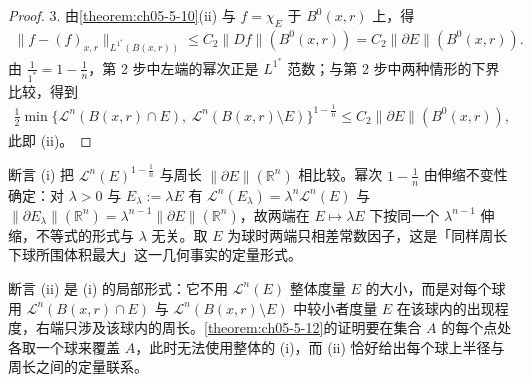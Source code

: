 ﻿\documentclass[../../main.tex]{subfiles}%
\begin{document}
\begin{proof}
3. 由\cref{theorem:ch05-5-10}(ii) 与 $f=\chi_E$ 于 $B^0(x,r)$ 上，得%
\begin{align*}
\lVert f-(f)_{x,r}\rVert_{L^{1^*}(B(x,r))}\leqslant C_2\lVert Df\rVert(B^0(x,r))=C_2\lVert\partial E\rVert(B^0(x,r)).
\end{align*}
由 $\frac{1}{1^*}=1-\frac1n$，第 2 步中左端的幂次正是 $L^{1^*}$ 范数；与第 2 步中两种情形的下界比较，得到
\begin{align*}
\frac12\min\bigl\{\mathcal{L}^n(B(x,r)\cap E),\ \mathcal{L}^n(B(x,r)\setminus E)\bigr\}^{1-\frac1n}\leqslant C_2\lVert\partial E\rVert(B^0(x,r)),
\end{align*}
此即 (ii)。
\end{proof}

\begin{remark}\label{remark:ch05-thm-5-11-动机}
断言 (i) 把 $\mathcal{L}^n(E)^{1-\frac1n}$ 与周长 $\lVert\partial E\rVert(\mathbb{R}^n)$ 相比较。幂次 $1-\frac1n$ 由伸缩不变性确定：对 $\lambda>0$ 与 $E_\lambda:=\lambda E$ 有 $\mathcal{L}^n(E_\lambda)=\lambda^n\mathcal{L}^n(E)$ 与 $\lVert\partial E_\lambda\rVert(\mathbb{R}^n)=\lambda^{n-1}\lVert\partial E\rVert(\mathbb{R}^n)$，故两端在 $E\mapsto\lambda E$ 下按同一个 $\lambda^{n-1}$ 伸缩，不等式的形式与 $\lambda$ 无关。取 $E$ 为球时两端只相差常数因子，这是「同样周长下球所围体积最大」这一几何事实的定量形式。

断言 (ii) 是 (i) 的局部形式：它不用 $\mathcal{L}^n(E)$ 整体度量 $E$ 的大小，而是对每个球用 $\mathcal{L}^n(B(x,r)\cap E)$ 与 $\mathcal{L}^n(B(x,r)\setminus E)$ 中较小者度量 $E$ 在该球内的出现程度，右端只涉及该球内的周长。\cref{theorem:ch05-5-12}的证明要在集合 $A$ 的每个点处各取一个球来覆盖 $A$，此时无法使用整体的 (i)，而 (ii) 恰好给出每个球上半径与周长之间的定量联系。%
\end{remark}
\end{document}
